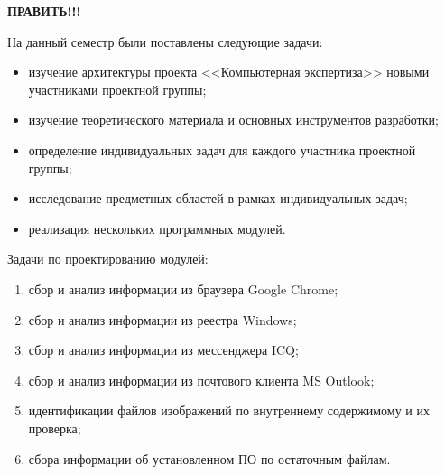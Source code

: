 \textbf{ПРАВИТЬ!!!}

На данный семестр были поставлены следующие задачи:

\begin{itemize}
\item изучение архитектуры проекта <<Компьютерная экспертиза>> новыми участниками проектной группы;
\item изучение теоретического материала и основных инструментов разработки;
\item определение индивидуальных задач для каждого участника проектной группы;
\item исследование предметных областей в рамках индивидуальных задач; 
\item реализация нескольких программных модулей.
\end{itemize}

Задачи по проектированию модулей:

\begin{enumerate}
\item сбор и анализ информации из браузера Google Chrome;
\item сбор и анализ информации из реестра Windows;
\item сбор и анализ информации из мессенджера ICQ;
\item сбор и анализ информации из почтового клиента MS Outlook;
\item идентификации файлов изображений по внутреннему содержимому и их проверка;
\item сбора информации об установленном ПО по остаточным файлам.
\end{enumerate}
